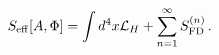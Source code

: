 \begin{equation}
S_{\rm eff}[A, \Phi] = \int d^4 x {\mathcal L}_H + \sum_{n=1}^{\infty} 
S_{\rm FD}^{(n)}\, .
\label{SeffFD}
\end{equation}

